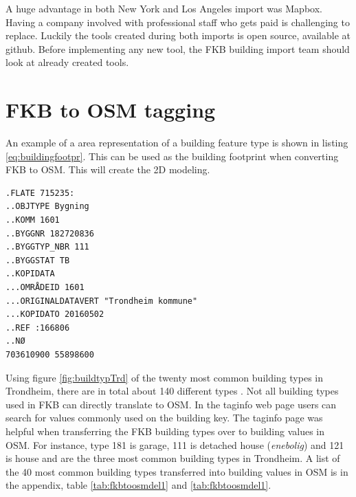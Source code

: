 A huge advantage in both New York and Los Angeles import was Mapbox. Having a company involved with professional staff who gets paid is challenging to replace. Luckily the tools created during both imports is open source, available at github. Before implementing any new tool, the FKB building import team should look at already created tools.  

\section{FKB to OSM tagging}

An example of a area representation of a building feature type is shown in listing \ref{eq:buildingfootpr}. This can be used as the building footprint when converting FKB to OSM. This will create the 2D modeling. 

\begin{lstlisting}
.FLATE 715235:
..OBJTYPE Bygning
..KOMM 1601
..BYGGNR 182720836
..BYGGTYP_NBR 111
..BYGGSTAT TB
..KOPIDATA
...OMRÅDEID 1601
...ORIGINALDATAVERT "Trondheim kommune"
...KOPIDATO 20160502
..REF :166806
..NØ
703610900 55898600
\end{lstlisting}

Using figure \ref{fig:buildtypTrd} of the twenty most common building types in Trondheim, there are in total about 140 different types \cite{SOSI-sekretariatet}. Not all building types used in FKB can directly translate to OSM. In the taginfo web page users can search for values commonly used on the building key. The taginfo page was helpful when transferring the FKB building types over to building values in OSM. For instance, type 181 is garage, 111 is detached house (\textit{enebolig}) and 121 is house and are the three most common building types in Trondheim. A list of the 40 most common building types transferred into building values in OSM is in the appendix, table \ref{tab:fkbtoosmdel1} and \ref{tab:fkbtoosmdel1}. 


